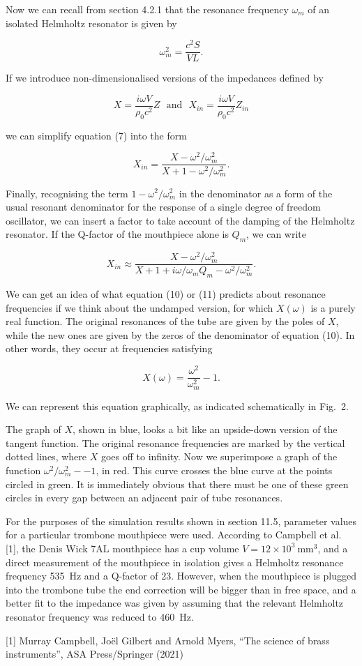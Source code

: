   Now we can recall from section 4.2.1 that the resonance frequency $\omega_m$ 
  of an isolated Helmholtz resonator is given by 

  $$\omega_m^2 =\dfrac{c^2S}{VL} . \tag{8}$$ 

  If we introduce non-dimensionalised versions of the impedances defined by 

  $$X=\dfrac{i \omega V}{\rho_0 c^2}Z \mathrm{~~~and~~~} X_{in}=\dfrac{i \omega 
  V}{\rho_0 c^2}Z_{in} \tag{9}$$ 

  we can simplify equation (7) into the form 

  $$X_{in}=\dfrac{X-\omega^2/\omega_m^2}{X+1-\omega^2/\omega_m^2}. \tag{10}$$ 

  Finally, recognising the term $1-\omega^2/\omega_m^2$ in the denominator as a 
  form of the usual resonant denominator for the response of a single degree of 
  freedom oscillator, we can insert a factor to take account of the damping of 
  the Helmholtz resonator. If the Q-factor of the mouthpiece alone is $Q_m$, we 
  can write 

  $$X_{in} \approx \dfrac{X-\omega^2/\omega_m^2}{X+1+i \omega/\omega_m 
  Q_m-\omega^2/\omega_m^2}. \tag{11}$$ 

  We can get an idea of what equation (10) or (11) predicts about resonance 
  frequencies if we think about the undamped version, for which $X(\omega)$ is 
  a purely real function. The original resonances of the tube are given by the 
  poles of $X$, while the new ones are given by the zeros of the denominator of 
  equation (10). In other words, they occur at frequencies satisfying 

  $$X(\omega)=\dfrac{\omega^2}{\omega_m^2}-1. \tag{12}$$ 

  We can represent this equation graphically, as indicated schematically in 
  Fig.\ 2. 

  The graph of $X$, shown in blue, looks a bit like an upside-down version of 
  the tangent function. The original resonance frequencies are marked by the 
  vertical dotted lines, where $X$ goes off to infinity. Now we superimpose a 
  graph of the function $\omega^2/\omega_m^2 -- 1$, in red. This curve crosses 
  the blue curve at the points circled in green. It is immediately obvious that 
  there must be one of these green circles in every gap between an adjacent 
  pair of tube resonances. 

  For the purposes of the simulation results shown in section 11.5, parameter 
  values for a particular trombone mouthpiece were used. According to Campbell 
  et al. [1], the Denis Wick 7AL mouthpiece has a cup volume $V=12 \times 
  10^3\mathrm{~mm^3}$, and a direct measurement of the mouthpiece in isolation 
  gives a Helmholtz resonance frequency 535~Hz and a Q-factor of 23. However, 
  when the mouthpiece is plugged into the trombone tube the end correction will 
  be bigger than in free space, and a better fit to the impedance was given by 
  assuming that the relevant Helmholtz resonator frequency was reduced to 
  460~Hz. 

  \sectionreferences{}[1] Murray Campbell, Joël Gilbert and Arnold Myers, “The 
  science of brass instruments”, ASA Press/Springer (2021) 